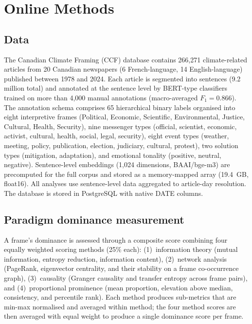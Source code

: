 \begingroup\sloppy
\section*{Online Methods}\label{sec:methods}

\subsection*{Data}

The Canadian Climate Framing (CCF) database\cite{lemorCCFDatabase2026} contains 266,271 climate-related articles from 20 Canadian newspapers (6 French-language, 14 English-language) published between 1978 and 2024. Each article is segmented into sentences (9.2 million total) and annotated at the sentence level by BERT-type classifiers trained on more than 4,000 manual annotations (macro-averaged $F_1 = 0.866$). The annotation schema comprises 65 hierarchical binary labels organised into eight interpretive frames (Political, Economic, Scientific, Environmental, Justice, Cultural, Health, Security), nine messenger types (official, scientist, economic, activist, cultural, health, social, legal, security), eight event types (weather, meeting, policy, publication, election, judiciary, cultural, protest), two solution types (mitigation, adaptation), and emotional tonality (positive, neutral, negative). Sentence-level embeddings (1,024 dimensions, BAAI/bge-m3) are precomputed for the full corpus and stored as a memory-mapped array (19.4~GB, float16). All analyses use sentence-level data aggregated to article-day resolution. The database is stored in PostgreSQL with native DATE columns.

\subsection*{Paradigm dominance measurement}

A frame's dominance is assessed through a composite score combining four equally weighted scoring methods (25\% each): (1)~information theory (mutual information, entropy reduction, information content), (2)~network analysis (PageRank, eigenvector centrality, and their stability on a frame co-occurrence graph), (3)~causality (Granger causality and transfer entropy across frame pairs), and (4)~proportional prominence (mean proportion, elevation above median, consistency, and percentile rank). Each method produces sub-metrics that are min-max normalised and averaged within method; the four method scores are then averaged with equal weight to produce a single dominance score per frame.

